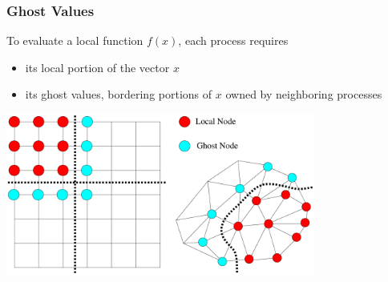 \begin{frame}
\frametitle{Ghost Values}

\begin{block}{To evaluate a local function $f(x)$, each process requires}
\begin{itemize}
  \item its local portion of the vector $x$
  \item its {\color{cyan}ghost values}, bordering portions of $x$ owned by neighboring processes
\end{itemize}
\end{block}

\begin{center}
\includegraphics[width=4in]{figures/GhostValues}
\end{center}

\end{frame}
